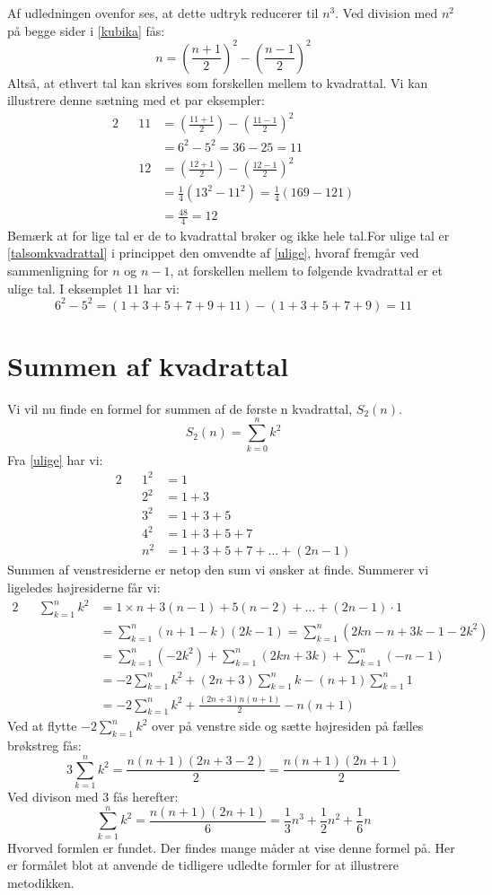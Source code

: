 Af udledningen ovenfor ses, at dette udtryk reducerer til \(n^3\). Ved division med \(n^2\) på begge sider i \ref{kubika} fås:
\begin{equation}
n=\left(\frac{n+1}{2}\right)^2-\left(\frac{n-1}{2}\right)^2\label{talsomkvadrattal}
\end{equation}
Altså, at ethvert tal kan skrives som forskellen mellem to kvadrattal. Vi kan illustrere denne sætning med et par eksempler:
\begin{alignat*}{2}
&&11&=\left(\frac{11+1}{2}\right)-\left(\frac{11-1}{2}\right)^2\\
&&&=6^2-5^2=36-25=11\\
&&12&=\left(\frac{12+1}{2}\right)-\left(\frac{12-1}{2}\right)^2\\
&&&=\frac{1}{4}(13^2-11^2)=\frac{1}{4}(169-121)\\
&&&=\frac{48}{4}=12
\end{alignat*}
Bemærk at for lige tal er de to kvadrattal brøker og ikke hele tal.For ulige tal er \ref{talsomkvadrattal} i princippet den omvendte af \ref{ulige}, hvoraf fremgår ved sammenligning for \(n\) og \(n-1\), at forskellen mellem to følgende kvadrattal er et ulige tal. I eksemplet \(11\) har vi:
\[6^2-5^2=(1+3+5+7+9+11)-(1+3+5+7+9)=11\]

\section{Summen af kvadrattal}
Vi vil nu finde en formel for summen af de første n kvadrattal, \(S_2(n)\).
\[S_2(n)=\sum_{k=0}^{n}k^2\]
Fra \ref{ulige} har vi:
\begin{alignat*}{2}
&&1^2&=1\\
&&2^2&=1+3\\
&&3^2&=1+3+5\\
&&4^2&=1+3+5+7\\
&&n^2&=1+3+5+7+\ldots+(2n-1)
\end{alignat*}
Summen af venstresiderne er netop den sum vi ønsker at finde. Summerer vi ligeledes højresiderne får vi:
\begin{alignat*}{2}
&&\sum_{k=1}^{n}k^2&=1 \times n+3(n-1)+5(n-2)+ \ldots + (2n-1)\cdot 1\\
&&&=\sum_{k=1}^n(n+1-k)(2k-1)=\sum_{k=1}^{n}(2kn-n+3k-1-2k^2)\\
&&&=\sum_{k=1}^{n}(-2k^2)+\sum_{k=1}^{n}(2kn+3k)+\sum_{k=1}^{n}(-n-1)\\
&&&=-2\sum_{k=1}^{n}k^2+(2n+3)\sum_{k=1}^{n}k-(n+1)\sum_{k=1}^{n}1\\
&&&=-2\sum_{k=1}^{n}k^2+\frac{(2n+3)n(n+1)}{2}-n(n+1)
\end{alignat*}
Ved at flytte \(-2\sum_{k=1}^{n}k^2\) over på venstre side og sætte højresiden på fælles brøkstreg fås:
\[3\sum_{k=1}^{n}k^2=\frac{n(n+1)(2n+3-2)}{2}=\frac{n(n+1)(2n+1)}{2}\]
Ved divison med 3 fås herefter:
\begin{equation}
\sum_{k=1}^{n}k^2=\frac{n(n+1)(2n+1)}{6}=\frac{1}{3}n^3+\frac{1}{2}n^2+\frac{1}{6}n
\end{equation}
Hvorved formlen er fundet. Der findes mange måder at vise denne formel på. Her er formålet blot at anvende de tidligere udledte formler for at illustrere metodikken.

